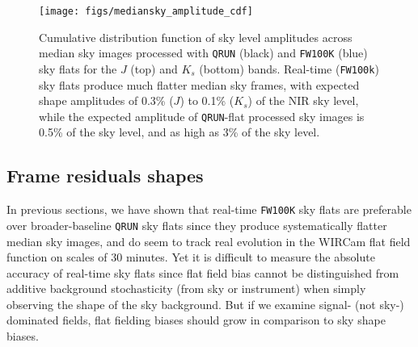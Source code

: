\documentclass[iop]{emulateapj}
\begin{document}
\begin{figure}[t]
\centering
\texttt{[image: figs/mediansky\_amplitude\_cdf]}
\caption{Cumulative distribution function of sky level amplitudes across median sky images processed with \texttt{QRUN} (black) and \texttt{FW100K} (blue) sky flats for the $J$ (top) and $K_s$ (bottom) bands. Real-time (\texttt{FW100k}) sky flats produce much flatter median sky frames, with expected shape amplitudes of 0.3\% ($J$) to 0.1\% ($K_s$) of the NIR sky level, while the expected amplitude of \texttt{QRUN}-flat processed sky images is 0.5\% of the sky level, and as high as 3\% of the sky level.
}
\label{fig:mediansky_amplitude}
\end{figure}

\subsection{Frame residuals shapes}
\label{sec:frameblockresiduals}

In previous sections, we have shown that real-time \texttt{FW100K} sky flats are preferable over broader-baseline \texttt{QRUN} sky flats since they produce systematically flatter median sky images, and do seem to track real evolution in the WIRCam flat field function on scales of 30 minutes.
Yet it is difficult to measure the absolute accuracy of real-time sky flats since flat field bias cannot be distinguished from additive background stochasticity (from sky or instrument) when simply observing the shape of the sky background.
But if we examine signal- (not sky-) dominated fields, flat fielding biases should grow in comparison to sky shape biases.
\end{document}

